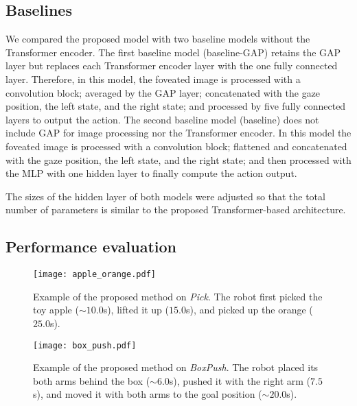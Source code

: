 \documentclass[letterpaper, 10 pt, conference]{ieeeconf}  %
\renewcommand\hl[1]{#1} %
\begin{document}
\subsection{Baselines}
We compared the proposed model with two baseline models without the Transformer encoder.
\hl{The first baseline model (baseline-GAP) retains the GAP layer but replaces each Transformer encoder layer with the one fully connected layer. Therefore, in this model, the foveated image is processed with a convolution block; averaged by the GAP layer; concatenated with the gaze position, the left state, and the right state; and processed by five fully connected layers to output the action. The second baseline model (baseline) does not include GAP for image processing nor the Transformer encoder. In this model the foveated image is processed with a convolution block; flattened and concatenated with the gaze position, the left state, and the right state; and then processed with the MLP with one hidden layer to finally compute the action output. }


The sizes of the hidden layer of both models were adjusted so that the total number of parameters is similar to the proposed Transformer-based architecture.


\subsection{Performance evaluation}
 
\begin{figure*}
\centering 
\vspace{0.1in}
\texttt{[image: apple\_orange.pdf]}
\caption{Example of the proposed method on \textit{Pick}. The robot first picked the toy apple ($\sim10.0$s), lifted it up ($15.0$s), and picked up the orange ($25.0$s).}
\label{fig:apple_orange}
\end{figure*}


\begin{figure*}
\centering 
\vspace{0.1in}
\texttt{[image: box\_push.pdf]}
\caption{Example of the proposed method on \textit{BoxPush}. The robot placed its both arms behind the box ($\sim6.0$s), pushed it with the right arm ($7.5$s), and moved it with both arms to the goal position ($\sim20.0$s).}
\label{fig:box_push}
\end{figure*}
\end{document}
